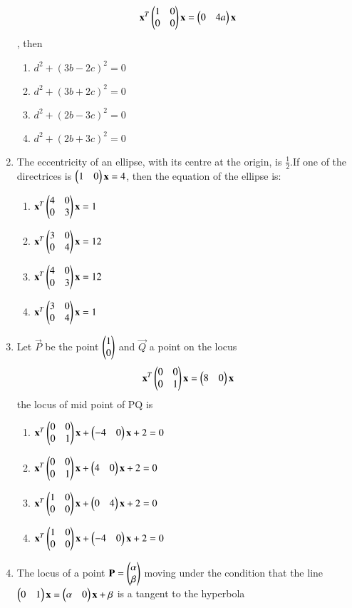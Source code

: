 \documentclass[journal,12pt,twocolumn]{IEEEtran}
\begin{document}
\begin{enumerate}[label=\arabic*]
    \begin{align}
    \mathbf{x}^T\begin{pmatrix}1&0\\0&0\end{pmatrix}\mathbf{x}=\begin{pmatrix}0&4a\end{pmatrix}\mathbf{x}
    \end{align}, then 
    \begin{enumerate}
    \item $d^2+(3b-2c)^2=0$
    \item $d^2+(3b+2c)^2=0$
    \item $d^2+(2b-3c)^2=0$
    \item $d^2+(2b+3c)^2=0$
    \end{enumerate}
    \item The eccentricity of an ellipse, with its centre at the origin, is $\frac{1}{2}$.If one of the directrices is $\begin{pmatrix}1&0\end{pmatrix}\mathbf{x}=4$, then the equation of the ellipse is:
    \begin{enumerate}
    \item $\mathbf{x}^T\begin{pmatrix}4&0\\0&3\end{pmatrix}\mathbf{x}=1$
    \item $\mathbf{x}^T\begin{pmatrix}3&0\\0&4\end{pmatrix}\mathbf{x}=12$
    \item $\mathbf{x}^T\begin{pmatrix}4&0\\0&3\end{pmatrix}\mathbf{x}=12$ 
    \item $\mathbf{x}^T\begin{pmatrix}3&0\\0&4\end{pmatrix}\mathbf{x}=1$
    \end{enumerate}
    \item Let $\vec{P}$ be the point $\begin{pmatrix}1\\0\end{pmatrix}$ and $\vec{Q}$ a point on the locus 
    \begin{align}
    \mathbf{x}^T\begin{pmatrix}0&0\\0&1\end{pmatrix}\mathbf{x}=\begin{pmatrix}8&0\end{pmatrix}\mathbf{x}
    \end{align}
    the locus of mid point of PQ is 
    \begin{enumerate}
    \item $\mathbf{x}^T\begin{pmatrix}0&0\\0&1\end{pmatrix}\mathbf{x}+\begin{pmatrix}-4&0\end{pmatrix}\mathbf{x}+2=0$
    \item $\mathbf{x}^T\begin{pmatrix}0&0\\0&1\end{pmatrix}\mathbf{x}+\begin{pmatrix}4&0\end{pmatrix}\mathbf{x}+2=0$
    \item $\mathbf{x}^T\begin{pmatrix}1&0\\0&0\end{pmatrix}\mathbf{x}+\begin{pmatrix}0&4\end{pmatrix}\mathbf{x}+2=0$
    \item $\mathbf{x}^T\begin{pmatrix}1&0\\0&0\end{pmatrix}\mathbf{x}+\begin{pmatrix}-4&0\end{pmatrix}\mathbf{x}+2=0$
    \end{enumerate}
    \item The locus of a point $\mathbf{P} = \begin{pmatrix}\alpha\\\beta\end{pmatrix}$ moving under the condition that the line $\begin{pmatrix}0&1\end{pmatrix}\mathbf{x}=\begin{pmatrix}\alpha&0\end{pmatrix}\mathbf{x}+\beta$ is a tangent to the hyperbola

\end{enumerate}
\end{document}
